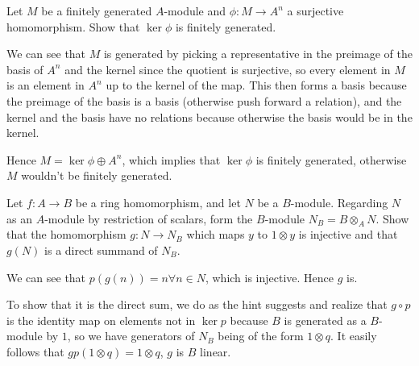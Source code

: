 \documentclass[a4paper]{exam}
\newif\ifhint
\begin{document}
\begin{questions}

	\question Let $M$ be a finitely generated $A$-module and $\phi :M\to A^n$ a surjective homomorphism. Show that $\ker \phi$ is finitely generated.
	\ifhint
		Let $e_{1}, \ldots , e_n$ be a basis of $A^n$ and choose $u_i \in M$ such that $\phi (u_i) = e_i (1\le i\le n)$. Show that $M$ is the direct sum of $\ker \phi$ and the submodule generated by $u_1, \ldots , u_n$.
	\fi
	\begin{solution}
		We can see that $M$ is generated by picking a representative in the preimage of the basis of $A^n$ and the kernel since the quotient is surjective, so every element in $M$ is an element in $A^n$ up to the kernel of the map.
		This then forms a basis because the preimage of the basis is a basis (otherwise push forward a relation), and the kernel and the basis have no relations because otherwise the basis would be in the kernel.

		Hence $M = \ker \phi \oplus A^n $, which implies that $\ker \phi$ is finitely generated, otherwise $M$ wouldn't be finitely generated.
	\end{solution}

	\question Let $f: A\to B$ be a ring homomorphism, and let $N$ be a $B$-module. Regarding $N$ as an $A$-module by restriction of scalars, form the $B$-module $N_B = B \otimes _A N$. Show that the homomorphism $g: N \to N_B$ which maps $y$ to $1 \otimes  y$ is injective and that $g(N)$ is a direct summand of $N_B$.
	\ifhint
		Define $p: N_B \to N_b$ by $p(b \otimes y) = by $, and show that $N_B = \Im (g) \oplus \ker (p)$.
	\fi
	\begin{solution}
		We can see that $p(g(n)) = n \forall n \in N $, which is injective.
		Hence $g$ is.

		To show that it is the direct sum, we do as the hint suggests and realize that $g\circ p$ is the identity map on elements not in $\ker p$ because $B$ is generated as a $B$-module by $1 $, so we have generators of $N_B$ being of the form $1 \otimes q$.
		It easily follows that $gp(1 \otimes q) = 1 \otimes q $, $g$ is $B$ linear.


\end{solution}
\end{questions}
\end{document}
